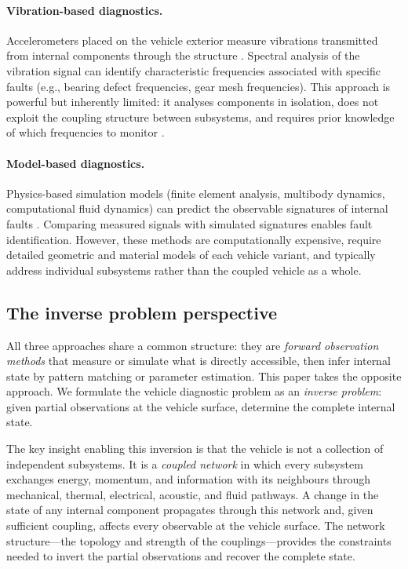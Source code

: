 \documentclass[twocolumn,10pt,a4paper]{article}
\theoremstyle{definition}
\theoremstyle{remark}
\begin{document}
\paragraph{Vibration-based diagnostics.} Accelerometers placed on the vehicle exterior measure vibrations transmitted from internal components through the structure \citep{Randall2011, Henriquez2014}. Spectral analysis of the vibration signal can identify characteristic frequencies associated with specific faults (e.g., bearing defect frequencies, gear mesh frequencies). This approach is powerful but inherently limited: it analyses components in isolation, does not exploit the coupling structure between subsystems, and requires prior knowledge of which frequencies to monitor \citep{Jardine2006}.

\paragraph{Model-based diagnostics.} Physics-based simulation models (finite element analysis, multibody dynamics, computational fluid dynamics) can predict the observable signatures of internal faults \citep{Lei2020}. Comparing measured signals with simulated signatures enables fault identification. However, these methods are computationally expensive, require detailed geometric and material models of each vehicle variant, and typically address individual subsystems rather than the coupled vehicle as a whole.

\subsection{The inverse problem perspective}

All three approaches share a common structure: they are \emph{forward observation methods} that measure or simulate what is directly accessible, then infer internal state by pattern matching or parameter estimation. This paper takes the opposite approach. We formulate the vehicle diagnostic problem as an \emph{inverse problem}: given partial observations at the vehicle surface, determine the complete internal state.

The key insight enabling this inversion is that the vehicle is not a collection of independent subsystems. It is a \emph{coupled network} in which every subsystem exchanges energy, momentum, and information with its neighbours through mechanical, thermal, electrical, acoustic, and fluid pathways. A change in the state of any internal component propagates through this network and, given sufficient coupling, affects every observable at the vehicle surface. The network structure---the topology and strength of the couplings---provides the constraints needed to invert the partial observations and recover the complete state.
\end{document}
